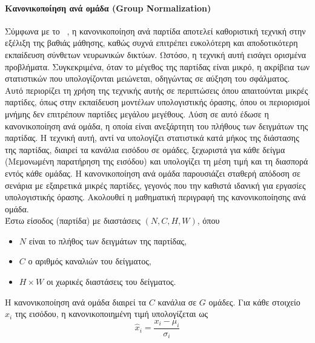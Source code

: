 \documentclass[12pt]{article}
\numberwithin{equation}{section}
\begin{document}
\paragraph{Κανονικοποίηση ανά ομάδα (Group Normalization) \\ [0.5cm]}

Σύμφωνα με το ~\cite{wu2018groupnormalization}, η κανονικοποίηση ανά παρτίδα αποτελεί καθοριστική τεχνική στην εξέλιξη της βαθιάς μάθησης, καθώς συχνά επιτρέπει ευκολότερη και αποδοτικότερη εκπαίδευση σύνθετων νευρωνικών δικτύων. Ωστόσο, η τεχνική αυτή εισάγει ορισμένα προβλήματα. Συγκεκριμένα, όταν το μέγεθος της παρτίδας είναι μικρό, η ακρίβεια των στατιστικών που υπολογίζονται μειώνεται, οδηγώντας σε αύξηση του σφάλματος. Αυτό περιορίζει τη χρήση της τεχνικής αυτής σε περιπτώσεις όπου απαιτούνται μικρές παρτίδες, όπως στην εκπαίδευση μοντέλων υπολογιστικής όρασης, όπου οι περιορισμοί μνήμης δεν επιτρέπουν παρτίδες μεγάλου μεγέθους. Λύση σε αυτό έδωσε η κανονικοποίηση ανά ομάδα, η οποία είναι ανεξάρτητη του πλήθους των δειγμάτων της παρτίδας. Η τεχνική αυτή, αντί να υπολογίζει στατιστικά κατά μήκος της διάστασης της παρτίδας, διαιρεί τα κανάλια εισόδου σε ομάδες, ξεχωριστά για κάθε δείγμα (Μεμονωμένη παρατήρηση της εισόδου) και υπολογίζει τη μέση τιμή και τη διασπορά εντός κάθε ομάδας. Η κανονικοποίηση ανά ομάδα παρουσιάζει σταθερή απόδοση σε σενάρια με εξαιρετικά μικρές παρτίδες, γεγονός που την καθιστά ιδανική για εργασίες υπολογιστικής όρασης. Ακολουθεί η μαθηματική περιγραφή της κανονικοποίησης ανά ομάδα. \\

\noindent Έστω είσοδος (παρτίδα) με διαστάσεις \((N, C, H, W)\), όπου\\

\begin{itemize}
  \item \(N\) είναι το πλήθος των δειγμάτων της παρτίδας,
  \item \(C\) ο αριθμός καναλιών του δείγματος,
  \item \(H \times W\) οι χωρικές διαστάσεις του δείγματος.
\end{itemize}

Η κανονικοποίηση ανά ομάδα διαιρεί τα \(C\) κανάλια σε \(G\) ομάδες. Για κάθε στοιχείο \(x_i\) της εισόδου, η κανονικοποιημένη τιμή υπολογίζεται ως \\
\begin{equation}
\hat{x}_i = \frac{x_i - \mu_i}{\sigma_i}
\end{equation}\\
\end{document}
